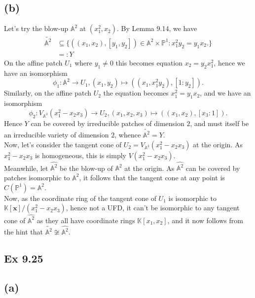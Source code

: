 \documentclass{article}
\theoremstyle{definition}
\newcommand{\K}{\mathbb{K}}
\renewcommand{\P}{\mathbb{P}}
\newcommand{\A}{\mathbb{A}}
\newcommand{\Kx}{\K[\bm{x}]}
\renewcommand{\AA}[1]{\A^{#1}}
\newcommand{\PP}[1]{\P^{#1}}
\begin{document}
\subsection*{(b)}

Let's try the blow-up $\AA{2}$ at $(x_1^2, x_2)$. By Lemma 9.14, we have 
\begin{align*}
	\widetilde{\AA{2}}
	&\subseteq
	\{
		((x_1, x_2), [y_1, y_2]) \in \AA{2} \times \PP{1} 
		:
		x_1^2 y_2 = y_1 x_2.
	\} \\
	&=:
	Y
\end{align*}
On the affine patch $U_1$ where $y_1 \not = 0$ this becomes equation
$x_2 = y_2 x_1^2$, hence we have an isomorphism 
\[
	\phi_1 : \AA{2} \to U_1,
	(x_1, y_2)
	\mapsto 
	((x_1, x_1^2 y_2), [1 : y_2]).
\] 
Similarly, on the affine patch $U_2$ the equation becomes 
$x_1^2 = y_1 x_2$, and we have an isomorphism 
\[
	\phi_2 : V_{\AA{3}}(x_1^2 - x_2 x_3) \to U_2,
	(x_1, x_2, x_3)
	\mapsto 
	((x_1, x_2), [x_3 : 1]).
\] 
Hence $Y$ can be covered by irreducible patches of dimension $2$, and must
itself be an irreducible variety of dimension $2$, whence $\widetilde{\AA{2}} =
Y$. \\

Now, let's consider the tangent cone of $U_2 = V_{\AA{3}}(x_1^2 - x_2 x_3)$ at
the origin. As $x_1^2 - x_2x_3$ is homogeneous, this is simply $V(x_1^2 -
x_2x_3)$. \\

Meanwhile, let $\widehat{\AA{2}}$ be the blow-up of $\AA{2}$ at the origin.
As $\widehat{\AA{2}}$ can be covered by patches isomorphic to $\AA{2}$, it
follows that the tangent cone at any point is $C(\PP{1}) = \AA{2}$. \\

Now, as the coordinate ring of the tangent cone of $U_1$ is isomorphic to
$\Kx/(x_1^2 - x_2 x_3)$, hence not a UFD, it can't be isomorphic to any tangent
cone of $\widehat{\AA{2}}$ as they all have coordinate rings $\K[x_1,x_2]$, and
it now follows from the hint that $\widetilde{\AA{2}} \not \cong
\widehat{\AA{2}}$.



\subsection*{Ex 9.25}

\subsection*{(a)}
\end{document}
